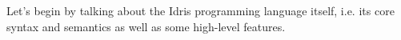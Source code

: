 Let's begin by talking about the Idris programming language itself, i.e. its core syntax and semantics
as well as some high-level features.
